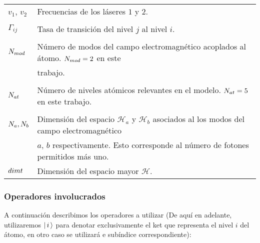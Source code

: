 \begin{tabular*}{\textwidth}{ll}
$v_1$, $v_2$ & Frecuencias de los l\'aseres $1$ y $2$.\\\\
$\Gamma_{ij}$ & Tasa de transici\'on del nivel $j$ al nivel $i$.\\\\
$N_{mod}$ & N\'umero de modos del campo electromagn\'etico acoplados al \'atomo. $N_{mod}=2$ en este \\&trabajo.\\\\
$N_{at}$ & N\'umero de niveles at\'omicos relevantes en el modelo. $N_{at}=5$ en este trabajo.\\\\
$N_a,N_b$ & Dimensi\'on del espacio $\mathcal{H}_a$ y $\mathcal{H}_b$ asociados al los modos del campo electromagn\'etico\\ &  $a$, $b$ respectivamente. Esto corresponde al n\'umero de fotones permitidos m\'as uno.\\
$dimt$ & Dimensi\'on del espacio mayor $\mathcal{H}$.
\end{tabular*} 

\subsubsection{Operadores involucrados}\label{sec:operadores_involucrados}

\quad A continuaci\'on describimos los operadores a utilizar (De aqu\'i en adelante, utilizaremos $\vert\, i \,\rangle$ para denotar exclusivamente el ket que representa el nivel $i$ del \'atomo, en otro caso se utilizar\'a e sub\'indice correspondiente):

